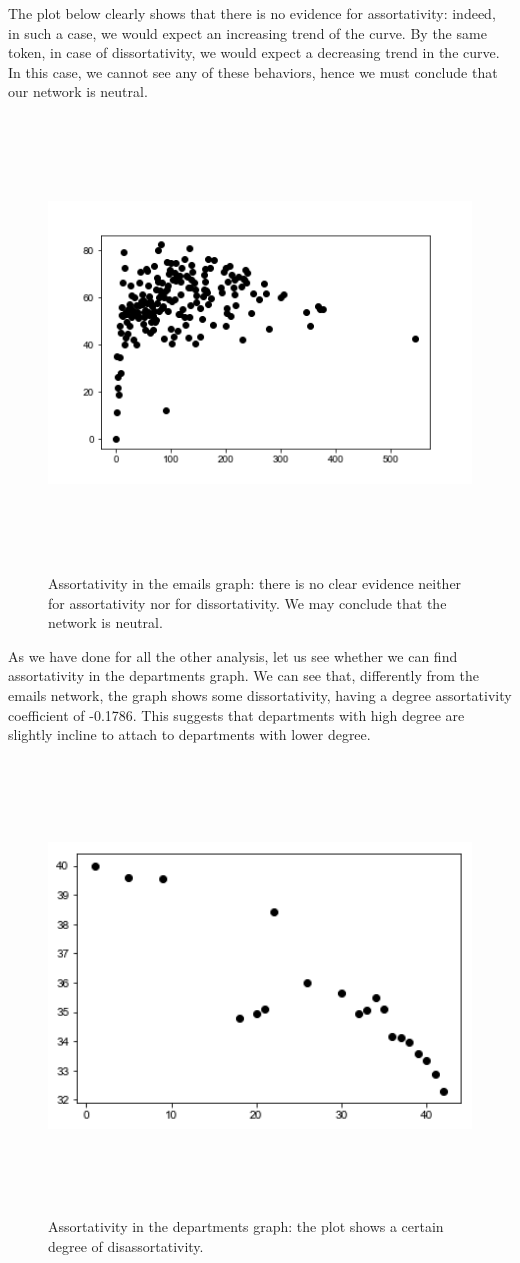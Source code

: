 \documentclass{report}
\theoremstyle{definition}
\theoremstyle{remark}
\begin{document}
The plot below clearly shows that there is no evidence for assortativity: indeed, in such a case, we would expect an increasing trend of the curve. By the same token, in case of dissortativity, we would expect a decreasing trend in the curve. In this case, we cannot see any of these behaviors, hence we must conclude that our network is neutral.
\begin{figure} [H]
	\centering
	\centerline{\includegraphics[width = 13cm, height = 12cm, keepaspectratio]{assortativity.png}}
	\label{Ass}
	\caption{Assortativity in the emails graph: there is no clear evidence neither for assortativity nor for dissortativity. We may conclude that the network is neutral.}
\end{figure}
As we have done for all the other analysis, let us see whether we can find assortativity in the departments graph. We can see that, differently from the emails network, the graph shows some dissortativity, having a degree assortativity coefficient of -0.1786. This suggests that departments with high degree are slightly incline to attach to departments with lower degree.
 \begin{figure} [H]
 	\centering
 	\centerline{\includegraphics[width = 13cm, height = 12cm, keepaspectratio]{assortativity_dep.png}}
 	\label{Ass_dep}
 	\caption{Assortativity in the departments graph: the plot shows a certain degree of disassortativity.}
 \end{figure}
\end{document}
